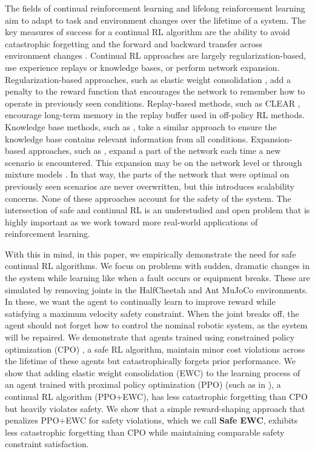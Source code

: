 The fields of continual reinforcement learning and lifelong reinforcement learning aim to adapt to task and environment changes over the lifetime of a system. The key measures of success for a continual RL algorithm are the ability to avoid catastrophic forgetting and the forward and backward transfer across environment changes \cite{khetarpal2022towards}. Continual RL approaches are largely regularization-based, use experience replays or knowledge bases, or perform network expansion. Regularization-based approaches, such as elastic weight consolidation \cite{kirkpatrick2017overcoming}, add a penalty to the reward function that encourages the network to remember how to operate in previously seen conditions.  Replay-based methods, such as CLEAR \cite{rolnick2019experience}, encourage long-term memory in the replay buffer used in off-policy RL methods. Knowledge base methods, such as \cite{zhan2017scalable}, take a similar approach to ensure the knowledge base contains relevant information from all conditions. Expansion-based approaches, such as \cite{zhang2023dynamics}, expand a part of the network each time a new scenario is encountered. This expansion may be on the network level \cite{kessler2022same} or through mixture models \cite{xu2020task}. In that way, the parts of the network that were optimal on previously seen scenarios are never overwritten, but this introduces scalability concerns. None of these approaches account for the safety of the system. The intersection of safe and continual RL is an understudied and open problem that is highly important as we work toward more real-world applications of reinforcement learning.

With this in mind, in this paper, we empirically demonstrate the need for safe continual RL algorithms. We focus on problems with sudden, dramatic changes in the system while learning like when a fault occurs or equipment breaks. These are simulated by removing joints in the HalfCheetah and Ant MuJoCo environments. In these, we want the agent to continually learn to improve reward while satisfying a maximum velocity safety constraint. When the joint breaks off, the agent should not forget how to control the nominal robotic system, as the system will be repaired. We demonstrate that agents trained using constrained policy optimization (CPO) \cite{achiam2017constrained}, a safe RL algorithm, maintain minor cost violations across the lifetime of these agents but catastrophically forgets prior performance. We show that adding elastic weight consolidation (EWC) \cite{kirkpatrick2017overcoming} to the learning process of an agent trained with proximal policy optimization (PPO) (such as in \cite{nath2023sharing}), a continual RL algorithm (PPO+EWC), has less catastrophic forgetting than CPO but heavily violates safety. We show that a simple reward-shaping approach that penalizes PPO+EWC for safety violations, which we call \textbf{Safe EWC}, exhibits less catastrophic forgetting than CPO while maintaining comparable safety constraint satisfaction.

